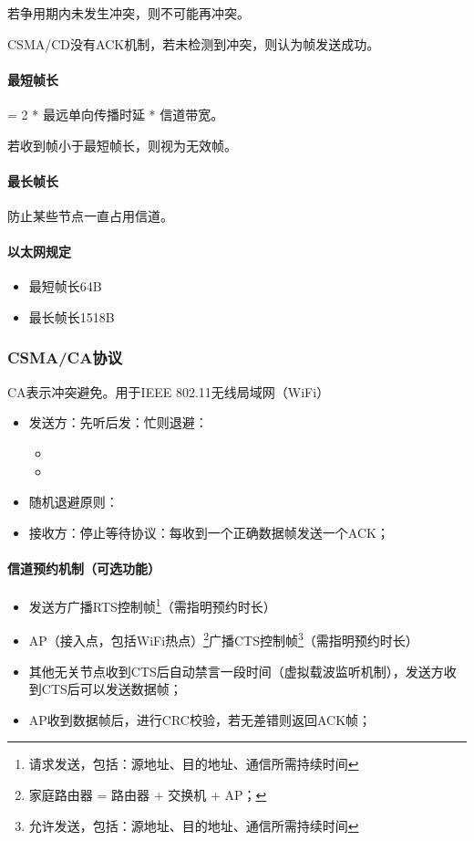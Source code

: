 若争用期内未发生冲突，则不可能再冲突。

CSMA/CD没有ACK机制，若未检测到冲突，则认为帧发送成功。

\paragraph{最短帧长}
= 2 * 最远单向传播时延 * 信道带宽。

若收到帧小于最短帧长，则视为无效帧。

\paragraph{最长帧长}
防止某些节点一直占用信道。

\paragraph{以太网规定}
\begin{itemize}
    \item 最短帧长64B
    \item 最长帧长1518B
\end{itemize}


\subsubsection{CSMA/CA协议}
CA表示冲突避免。用于IEEE 802.11无线局域网（WiFi）

\begin{itemize}
    \item 发送方：先听后发：忙则退避：\begin{itemize}
        \item 
        \item 
    \end{itemize}
    \item 随机退避原则：
    \item 接收方：停止等待协议：每收到一个正确数据帧发送一个ACK；
\end{itemize}

\paragraph{信道预约机制（可选功能）}
\begin{itemize}
    \item 发送方广播RTS控制帧\footnote{请求发送，包括：源地址、目的地址、通信所需持续时间}（需指明预约时长）
    \item AP（接入点，包括WiFi热点）\footnote{家庭路由器 = 路由器 + 交换机 + AP；}广播CTS控制帧\footnote{允许发送，包括：源地址、目的地址、通信所需持续时间}（需指明预约时长）
    \item 其他无关节点收到CTS后自动禁言一段时间（虚拟载波监听机制），发送方收到CTS后可以发送数据帧；
    \item AP收到数据帧后，进行CRC校验，若无差错则返回ACK帧；
\end{itemize}

